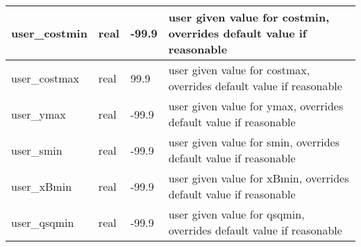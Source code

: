 \documentclass{article}
\begin{document}
\begin{longtable}{llll}
\midrule
user\_costmin & \begin{minipage}[t]{2cm}real\end{minipage} & \begin{minipage}[t]{2cm}-99.9\end{minipage} & \begin{minipage}[t]{12cm}user given value for costmin, overrides default value if reasonable\end{minipage}\\*
\midrule
user\_costmax & \begin{minipage}[t]{2cm}real\end{minipage} & \begin{minipage}[t]{2cm}99.9\end{minipage} & \begin{minipage}[t]{12cm}user given value for costmax, overrides default value if reasonable\end{minipage}\\*
\midrule
user\_ymax & \begin{minipage}[t]{2cm}real\end{minipage} & \begin{minipage}[t]{2cm}-99.9\end{minipage} & \begin{minipage}[t]{12cm}user given value for ymax, overrides default value if reasonable\end{minipage}\\*
\midrule
user\_smin & \begin{minipage}[t]{2cm}real\end{minipage} & \begin{minipage}[t]{2cm}-99.9\end{minipage} & \begin{minipage}[t]{12cm}user given value for smin, overrides default value if reasonable\end{minipage}\\*
\midrule
user\_xBmin & \begin{minipage}[t]{2cm}real\end{minipage} & \begin{minipage}[t]{2cm}-99.9\end{minipage} & \begin{minipage}[t]{12cm}user given value for xBmin, overrides default value if reasonable\end{minipage}\\*
\midrule
user\_qsqmin & \begin{minipage}[t]{2cm}real\end{minipage} & \begin{minipage}[t]{2cm}-99.9\end{minipage} & \begin{minipage}[t]{12cm}user given value for qsqmin, overrides default value if reasonable\end{minipage}\\*

\end{longtable}
\end{document}
